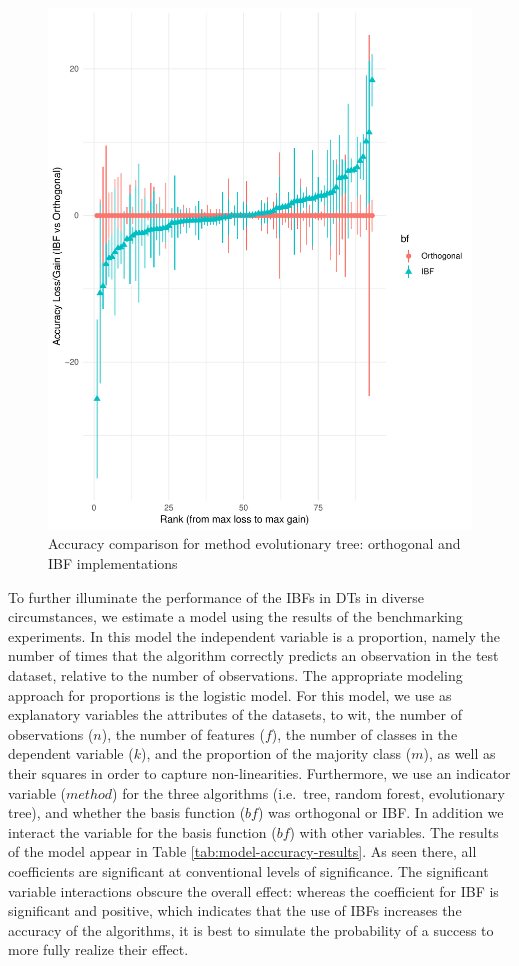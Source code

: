 \documentclass[]{elsarticle} %
\makeatletter
\def\maxwidth{\ifdim\Gin@nat@width>\linewidth\linewidth
\else\Gin@nat@width\fi}
\let\Oldincludegraphics\includegraphics
\renewcommand{\includegraphics}[1]{\Oldincludegraphics[width=\maxwidth]{#1}}
\makeatother
\begin{document}
\begin{figure}[htbp]
\centering
\includegraphics{Trees_with_Base_Functions_v2_files/figure-latex/fig11-accuracy-ev-1.pdf}
\caption{\label{fig:fig11-accuracy-ev}Accuracy comparison for method
evolutionary tree: orthogonal and IBF implementations}
\end{figure}

To further illuminate the performance of the IBFs in DTs in diverse
circumstances, we estimate a model using the results of the benchmarking
experiments. In this model the independent variable is a proportion,
namely the number of times that the algorithm correctly predicts an
observation in the test dataset, relative to the number of observations.
The appropriate modeling approach for proportions is the logistic model.
For this model, we use as explanatory variables the attributes of the
datasets, to wit, the number of observations (\(n\)), the number of
features (\(f\)), the number of classes in the dependent variable
(\(k\)), and the proportion of the majority class (\(m\)), as well as
their squares in order to capture non-linearities. Furthermore, we use
an indicator variable (\(method\)) for the three algorithms (i.e.~tree,
random forest, evolutionary tree), and whether the basis function
(\(bf\)) was orthogonal or IBF. In addition we interact the variable for
the basis function (\(bf\)) with other variables. The results of the
model appear in Table \ref{tab:model-accuracy-results}. As seen there,
all coefficients are significant at conventional levels of significance.
The significant variable interactions obscure the overall effect:
whereas the coefficient for IBF is significant and positive, which
indicates that the use of IBFs increases the accuracy of the algorithms,
it is best to simulate the probability of a success to more fully
realize their effect.
\end{document}
